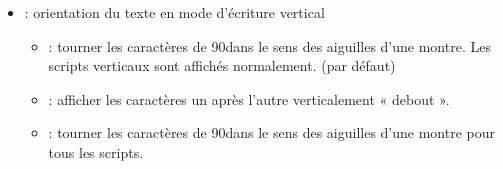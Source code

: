 \documentclass[xcolor=table]{beamer}
\begin{document}
\begin{frame}[fragile]
\begin{itemize}
\item {} : orientation du texte en mode d'écriture vertical
\begin{itemize}
	\item {} : tourner les caractères de 90\textdegree dans le sens des aiguilles d'une montre. 
	Les scripts verticaux sont affichés normalement. (par défaut)
	\item {} : afficher les caractères un après l'autre verticalement « debout ». 
	\item {} : tourner les caractères de 90\textdegree dans le sens des aiguilles d'une montre pour tous les scripts.
\end{itemize}
\end{itemize}
\end{frame}
\end{document}
